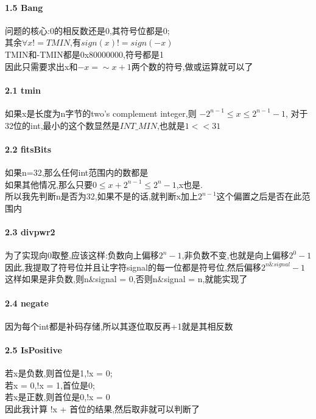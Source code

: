 \documentclass{article}
\begin{document}
\begin{CJK}{UTF8}{gkai}
\paragraph{1.5 Bang} 
问题的核心:0的相反数还是0,其符号位都是0;\\
其余$\forall x != TMIN$,有$sign(x)!=sign(-x)$\\
TMIN和-TMIN都是0x80000000,符号都是1\\
因此只需要求出x和$-x=\sim x+1$两个数的符号,做或运算就可以了

\paragraph{2.1 tmin} 
如果x是长度为n字节的two's complement integer,则 $-2^{n-1}\leq x \leq 2^{n-1}-1$,
对于32位的int,最小的这个数显然是$INT\_MIN$,也就是$1<<31$\\
\paragraph{2.2 fitsBits} 
如果n=32,那么任何int范围内的数都是\\
如果其他情况,那么只要$0\leq x + 2^{n-1} \leq 2^{n}-1$,x也是.\\
所以我先判断n是否为32,如果不是的话,就判断x加上$2^{n-1}$这个偏置之后是否在此范围内\\

\paragraph{2.3 divpwr2} 
为了实现向0取整,应该这样:负数向上偏移$2^{n} -1$,非负数不变,也就是向上偏移$2^{0} -1$\\
因此,我提取了符号位并且让字符signal的每一位都是符号位,然后偏移$2^{n\&signal}-1$\\
这样如果是非负数,则n\&signal = 0,否则n\&signal = n,就能实现了\\

\paragraph{2.4 negate} 
因为每个int都是补码存储,所以其逐位取反再+1就是其相反数

\paragraph{2.5 IsPositive} 
若x是负数,则首位是1,!x = 0;\\
若x = 0,!x = 1,首位是0;\\
若x是正数,则首位是0,!x = 0\\
因此我计算 !x + 首位的结果,然后取非就可以判断了\\


\end{CJK}
\end{document}
